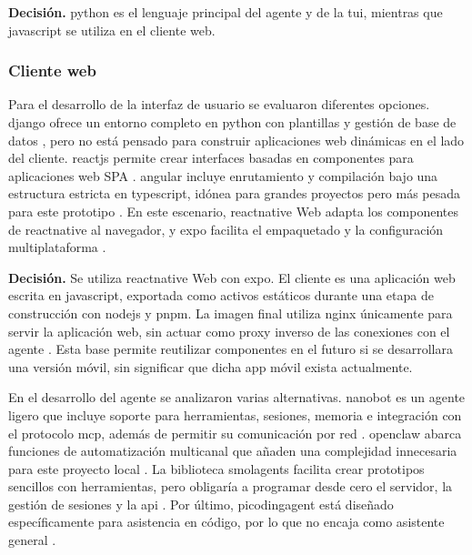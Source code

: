 \textbf{Decisión.} \Gls{python} es el lenguaje principal del agente y de la \gls{tui}, mientras que \gls{javascript} se utiliza en el cliente web.

\subsubsection{Cliente web}\label{subsec:cliente-web-localmind}

Para el desarrollo de la interfaz de usuario se evaluaron diferentes opciones. \Gls{django} ofrece un entorno completo en \gls{python} con plantillas y gestión de base de datos \cite{Django}, pero no está pensado para construir aplicaciones web dinámicas en el lado del cliente. \Gls{reactjs} permite crear interfaces basadas en componentes para aplicaciones web SPA \cite{react2026}. \Gls{angular} incluye enrutamiento y compilación bajo una estructura estricta en \gls{typescript}, idónea para grandes proyectos pero más pesada para este prototipo \cite{angular2026}. En este escenario, \gls{reactnative} Web adapta los componentes de \gls{reactnative} al navegador, y \gls{expo} facilita el empaquetado y la configuración multiplataforma \cite{meta2024reactnative,expo2024}.

\textbf{Decisión.} Se utiliza \gls{reactnative} Web con \gls{expo}. El cliente es una aplicación web escrita en \gls{javascript}, exportada como activos estáticos durante una etapa de construcción con \gls{nodejs} y \gls{pnpm}. La imagen final utiliza \gls{nginx} únicamente para servir la aplicación web, sin actuar como proxy inverso de las conexiones con el agente \cite{docker2026multistage,nginx2026}. Esta base permite reutilizar componentes en el futuro si se desarrollara una versión móvil, sin significar que dicha app móvil exista actualmente.

En el desarrollo del agente se analizaron varias alternativas. \Gls{nanobot} es un agente ligero que incluye soporte para herramientas, sesiones, memoria e integración con el protocolo \gls{mcp}, además de permitir su comunicación por red \cite{nanobot2026}. \Gls{openclaw} abarca funciones de automatización multicanal que añaden una complejidad innecesaria para este proyecto local \cite{openclaw2026}. La biblioteca \Gls{smolagents} facilita crear prototipos sencillos con herramientas, pero obligaría a programar desde cero el servidor, la gestión de sesiones y la \gls{api} \cite{smolagents2026}. Por último, \Gls{picodingagent} está diseñado específicamente para asistencia en código, por lo que no encaja como asistente general \cite{picodingagent2026}.

